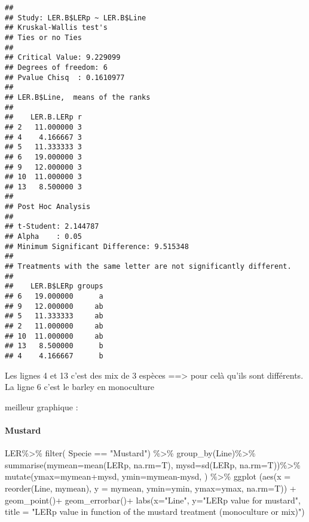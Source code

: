 \documentclass[
]{article}
\newenvironment{Shaded}{\begin{snugshade}}{\end{snugshade}}
\newcommand{\AttributeTok}[1]{\textcolor[rgb]{0.77,0.63,0.00}{#1}}
\newcommand{\FunctionTok}[1]{\textcolor[rgb]{0.00,0.00,0.00}{#1}}
\newcommand{\NormalTok}[1]{#1}
\newcommand{\SpecialCharTok}[1]{\textcolor[rgb]{0.00,0.00,0.00}{#1}}
\newcommand{\StringTok}[1]{\textcolor[rgb]{0.31,0.60,0.02}{#1}}
\begin{document}
\begin{verbatim}
## 
## Study: LER.B$LERp ~ LER.B$Line
## Kruskal-Wallis test's
## Ties or no Ties
## 
## Critical Value: 9.229099
## Degrees of freedom: 6
## Pvalue Chisq  : 0.1610977 
## 
## LER.B$Line,  means of the ranks
## 
##    LER.B.LERp r
## 2   11.000000 3
## 4    4.166667 3
## 5   11.333333 3
## 6   19.000000 3
## 9   12.000000 3
## 10  11.000000 3
## 13   8.500000 3
## 
## Post Hoc Analysis
## 
## t-Student: 2.144787
## Alpha    : 0.05
## Minimum Significant Difference: 9.515348 
## 
## Treatments with the same letter are not significantly different.
## 
##    LER.B$LERp groups
## 6   19.000000      a
## 9   12.000000     ab
## 5   11.333333     ab
## 2   11.000000     ab
## 10  11.000000     ab
## 13   8.500000      b
## 4    4.166667      b
\end{verbatim}

Les lignes 4 et 13 c'est des mix de 3 espèces ==\textgreater{} pour celà
qu'ils sont différents. La ligne 6 c'est le barley en monoculture

meilleur graphique :

\hypertarget{mustard}{%
\paragraph{Mustard}\label{mustard}}

\begin{Shaded}
\begin{Highlighting}[]
\NormalTok{LER}\SpecialCharTok{\%\textgreater{}\%}
  \FunctionTok{filter}\NormalTok{( Specie }\SpecialCharTok{==} \StringTok{"Mustard"}\NormalTok{) }\SpecialCharTok{\%\textgreater{}\%}
  \FunctionTok{group\_by}\NormalTok{(Line)}\SpecialCharTok{\%\textgreater{}\%}
  \FunctionTok{summarise}\NormalTok{(}\AttributeTok{mymean=}\FunctionTok{mean}\NormalTok{(LERp, }\AttributeTok{na.rm=}\NormalTok{T),}
            \AttributeTok{mysd=}\FunctionTok{sd}\NormalTok{(LERp, }\AttributeTok{na.rm=}\NormalTok{T))}\SpecialCharTok{\%\textgreater{}\%}
  \FunctionTok{mutate}\NormalTok{(}\AttributeTok{ymax=}\NormalTok{mymean}\SpecialCharTok{+}\NormalTok{mysd, }\AttributeTok{ymin=}\NormalTok{mymean}\SpecialCharTok{{-}}\NormalTok{mysd, ) }\SpecialCharTok{\%\textgreater{}\%}
  \FunctionTok{ggplot}\NormalTok{ (}\FunctionTok{aes}\NormalTok{(}\AttributeTok{x =} \FunctionTok{reorder}\NormalTok{(Line, mymean), }\AttributeTok{y =}\NormalTok{ mymean,}
              \AttributeTok{ymin=}\NormalTok{ymin, }\AttributeTok{ymax=}\NormalTok{ymax, }\AttributeTok{na.rm=}\NormalTok{T)) }\SpecialCharTok{+} 
  \FunctionTok{geom\_point}\NormalTok{()}\SpecialCharTok{+}
  \FunctionTok{geom\_errorbar}\NormalTok{()}\SpecialCharTok{+}
  \FunctionTok{labs}\NormalTok{(}\AttributeTok{x=}\StringTok{"Line"}\NormalTok{, }\AttributeTok{y=}\StringTok{"LERp value for mustard"}\NormalTok{, }\AttributeTok{title =} \StringTok{"LERp value in function of the mustard treatment (monoculture or mix)"}\NormalTok{)}
\end{Highlighting}
\end{Shaded}
\end{document}
